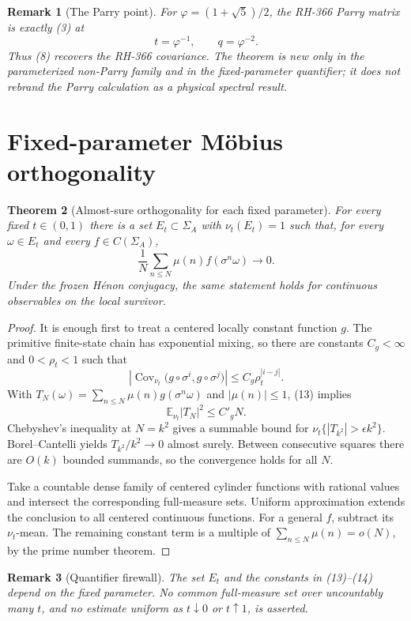 \documentclass[11pt]{article}
\newtheorem{theorem}{Theorem}[section]
\newtheorem{remark}[theorem]{Remark}
\newcommand{\Mob}{\mu}
\newcommand{\SigmaA}{\Sigma_A}
\newcommand{\Cov}{\operatorname{Cov}}
\newcommand{\E}{\mathbb E}
\begin{document}
\begin{remark}[The Parry point]
For $\varphi=(1+\sqrt5)/2$, the RH-366 Parry matrix is exactly (3) at
\[
 t=\varphi^{-1},\qquad q=\varphi^{-2}. \tag{11}
\]
Thus (8) recovers the RH-366 covariance.  The theorem is new only in the
parameterized non-Parry family and in the fixed-parameter quantifier; it does
not rebrand the Parry calculation as a physical spectral result.
\end{remark}

\section{Fixed-parameter Möbius orthogonality}

\begin{theorem}[Almost-sure orthogonality for each fixed parameter]
\label{thm:as}
For every fixed $t\in(0,1)$ there is a set $E_t\subset\SigmaA$ with
$\nu_t(E_t)=1$ such that, for every $\omega\in E_t$ and every
$f\in C(\SigmaA)$,
\[
 \frac1N\sum_{n\leq N}\Mob(n)f(\sigma^n\omega)\longrightarrow0. \tag{12}
\]
Under the frozen Hénon conjugacy, the same statement holds for continuous
observables on the local survivor.
\end{theorem}

\begin{proof}
It is enough first to treat a centered locally constant function $g$.  The
primitive finite-state chain has exponential mixing, so there are constants
$C_g<\infty$ and $0<\rho_t<1$ such that
\[
 \left|\Cov_{\nu_t}\bigl(g\circ\sigma^i,g\circ\sigma^j\bigr)\right|
 \le C_g\rho_t^{|i-j|}. \tag{13}
\]
With $T_N(\omega)=\sum_{n\le N}\Mob(n)g(\sigma^n\omega)$ and
$|\Mob(n)|\le1$, (13) implies
\[
 \E_{\nu_t}|T_N|^2\le C'_g N. \tag{14}
\]
Chebyshev's inequality at $N=k^2$ gives a summable bound for
\(\nu_t\{|T_{k^2}|>\epsilon k^2\}\).  Borel--Cantelli yields
$T_{k^2}/k^2\to0$ almost surely.  Between consecutive squares there are
$O(k)$ bounded summands, so the convergence holds for all $N$.

Take a countable dense family of centered cylinder functions with rational
values and intersect the corresponding full-measure sets.  Uniform
approximation extends the conclusion to all centered continuous functions.
For a general $f$, subtract its $\nu_t$-mean.  The remaining constant term is
a multiple of $\sum_{n\le N}\Mob(n)=o(N)$, by the prime number theorem.
\end{proof}

\begin{remark}[Quantifier firewall]
The set $E_t$ and the constants in (13)--(14) depend on the fixed parameter.
No common full-measure set over uncountably many $t$, and no estimate uniform
as $t\downarrow0$ or $t\uparrow1$, is asserted.
\end{remark}
\end{document}
